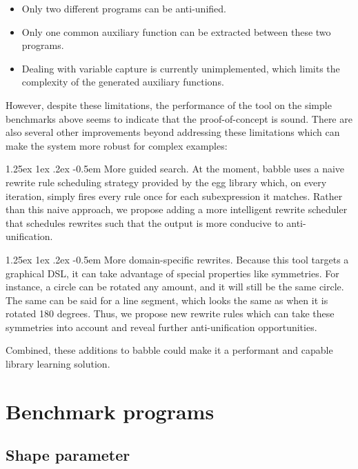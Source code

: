 \documentclass[acmsmall,nonacm]{acmart}\settopmatter{}
\makeatletter
\renewcommand\paragraph{\@startsection{paragraph}{4}{\z@}%
                                    {1.25ex \@plus1ex \@minus.2ex}%
                                    {-0.5em}%
                                    {\normalfont\normalsize\bfseries\@adddotafter}}
\makeatother
\begin{document}
\begin{itemize}
\item Only two different programs can be anti-unified.
\item Only one common auxiliary function can be extracted between these two programs.
\item Dealing with variable capture is currently unimplemented, which limits the complexity of the generated auxiliary functions.
\end{itemize}

However, despite these limitations, the performance of the tool on the simple benchmarks above seems to indicate that the proof-of-concept is sound. There are also several other improvements beyond addressing these limitations which can make the system more robust for complex examples:

\paragraph{More guided search.} At the moment, babble uses a naive rewrite rule scheduling strategy provided by the egg library which, on every iteration, simply fires every rule once for each subexpression it matches. Rather than this naive approach, we propose adding a more intelligent rewrite scheduler that schedules rewrites such that the output is more conducive to anti-unification.

\paragraph{More domain-specific rewrites.} Because this tool targets a graphical DSL, it can take advantage of special properties like symmetries. For instance, a circle can be rotated any amount, and it will still be the same circle. The same can be said for a line segment, which looks the same as when it is rotated 180 degrees. Thus, we propose new rewrite rules which can take these symmetries into account and reveal further anti-unification opportunities.

Combined, these additions to babble could make it a performant and capable library learning solution.

\appendix
\section{Benchmark programs}
\label{appendix:benches}

\subsection{Shape parameter}
\end{document}
